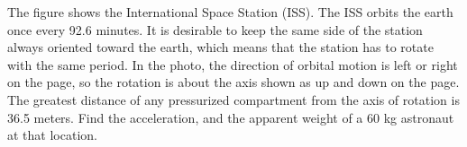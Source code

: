The figure shows the International Space Station (ISS). The ISS orbits the earth once every
92.6 minutes. It is desirable to keep the same side of the station always oriented toward the
earth, which means that the station has to rotate with the same period. In the photo, the
direction of orbital motion is left or right on the page, so the rotation is about the
axis shown as up and down on the page. The greatest distance of any pressurized compartment
from the axis of rotation is 36.5 meters. Find the acceleration, and the apparent weight of
a 60 kg astronaut at that location.\answercheck
